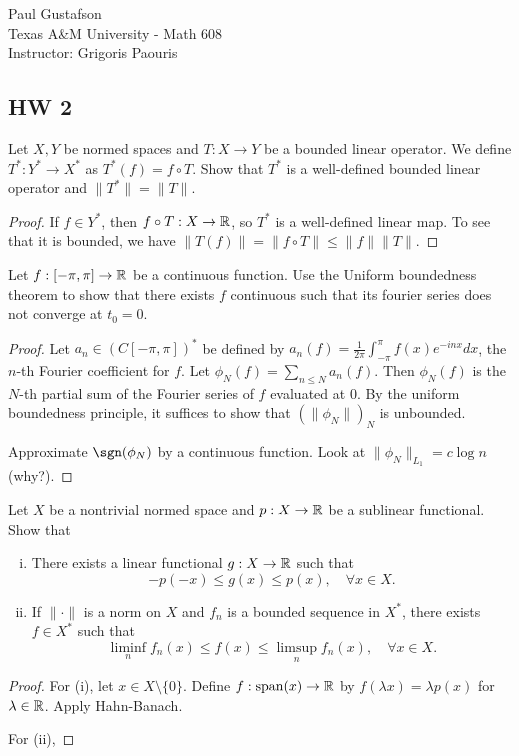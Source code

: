 \documentclass{article}
\begin{document}
\noindent Paul Gustafson\\
\noindent Texas A\&M University - Math 608 \\ 
\noindent Instructor: Grigoris Paouris

\subsection*{HW 2}
 Let $X, Y$ be normed spaces and $T: X \to Y$ be a bounded linear operator.  We define $T^*: Y^* \to X^*$ as $T^*(f) = f \circ T$. Show that $T^*$ is a well-defined bounded linear operator and $\|T^*\| = \|T\|$.

\begin{proof}
If $f \in Y^*$, then $f \circ T: X \to \mathbb{R}$, so $T^*$ is a well-defined linear map. To see that it is bounded, we have $\|T(f)\| = \|f \circ T\| \le \|f\| \|T\|$.
\end{proof}


 Let $f : [-\pi, \pi] \to \mathbb{R}$ be a continuous function. Use the Uniform boundedness theorem to show that there exists $f$ continuous such that its fourier series does not converge at $t_0 = 0$. %
\begin{proof}
Let $a_n \in (C[-\pi, \pi])^*$ be defined by $a_n(f) = \frac 1 {2\pi} \int_{-\pi}^\pi f(x) e^{-inx} dx$, the $n$-th Fourier coefficient for $f$. Let $\phi_N(f) = \sum_{n \le N} a_n(f)$. Then $\phi_N(f)$ is the $N$-th partial sum of the Fourier series of $f$ evaluated at $0$. By the uniform boundedness principle, it suffices to show that $(\|\phi_N\|)_N$ is unbounded.

Approximate $\sgn(\phi_N)$ by a continuous function.  Look at $\|\phi_N\|_{L_1} = c \log n$ (why?).

\end{proof}

 Let $X$ be a nontrivial normed space and $p: X \to \mathbb{R}$ be a sublinear functional. Show that 
\begin{enumerate}[i)]
\item There exists a linear functional $g : X \to \mathbb{R}$ such that 
$$ -p(-x) \le g(x) \le p(x), \quad \forall x \in X.$$
\item If $\|\cdot\|$ is a norm on $X$ and $f_n$ is a bounded sequence in $X^*$, there exists $f \in X^*$ such that 
$$\liminf_n f_n(x) \le f(x) \le \limsup_n f_n(x) , \quad \forall x \in X.$$
\end{enumerate}
\begin{proof}
For (i), let $x \in X \setminus \{0\}$.  Define $f: \operatorname{span}(x) \to \mathbb{R}$ by $f(\lambda x) = \lambda p(x)$ for $\lambda \in \mathbb{R}$.  Apply Hahn-Banach.

For (ii), 

\end{proof}
\end{document}
